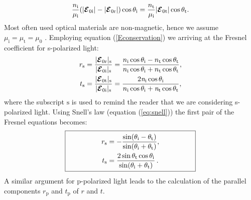 \begin{equation}
\frac{n_{\textrm{i}}}{\mu_{\textrm{i}}}(|\boldsymbol{\mathcal{E}}_{0\textrm{i}}|-|\boldsymbol{\mathcal{E}}_{0\textrm{r}}|)\cos\theta_{\textrm{i}} = \frac{n_{\textrm{t}}}{\mu_{\textrm{i}}}|\boldsymbol{\mathcal{E}}_{0\textrm{t}}|\cos\theta_{\textrm{t}}.
\end{equation}
Most often used optical materials are non-magnetic, hence we assume $\mu_{\textrm{i}}=\mu_{\textrm{t}}=\mu_{0}$ \cite{lvovsky2013fresnel}. Employing equation (\ref{Econservation}) we arriving at the Fresnel coefficient for s-polarized light:
\begin{equation} \label{Fresnel_perpendicular}
\begin{split}
r_{\textrm{s}} & =\frac{|\boldsymbol{\mathcal{E}}_{0 \textrm{r}}|_{\textrm{s}}}{|\boldsymbol{\mathcal{E}}_{0\textrm{i}}|_\textrm{s}} = 
\frac{n_\textrm{i}\cos\theta_\textrm{i}-n_\textrm{t} \cos\theta_\textrm{t}}{n_\textrm{i}
\cos\theta_\textrm{i}+n_\textrm{t}\cos\theta_\textrm{t}},\\
t_{\textrm{s}} & = \frac{|\boldsymbol{\mathcal{E}}_{0 \textrm{t}}|_\textrm{s}}{|\boldsymbol{\mathcal{E}}_{0\textrm{i}}|_\textrm{s}} 
=\frac{2\textit{n}_\textrm{i}\cos\theta_\textrm{i}}{n_\textrm{i}\cos\theta_\textrm{i}+\textit{n}_\textrm{t}\cos\theta_\textrm{t}},\\
\end{split}
\end{equation}
where the subscript $\textrm{s}$ is used to remind the reader that we are considering s-polarized light. 
Using Snell's law (equation (\ref{eq:snell})) the first pair of the Fresnel equations becomes:
\begin{equation}
\fbox{\begin{minipage}{18em}
\begin{equation*} \label{simple_Fresnel}
\begin{split}
r_{\textrm{s}} & = -\frac{\sin(\myangle_\textrm{i}-\myangle_\textrm{t})}{\sin(\myangle_\textrm{i}+\myangle_\textrm{t})},\\
t_{\textrm{s}} & = \frac{2\sin \myangle_\textrm{t} \cos \myangle_\textrm{i}}{\sin(\myangle_\textrm{i}+\myangle_\textrm{t})}\,.
\end{split}
\end{equation*}
\end{minipage}}
\end{equation}
\indent A similar argument for p-polarized light leads to the calculation of the parallel components $r_\textrm{p}$ and $t_\textrm{p}$ of $r$ and $t$. 
